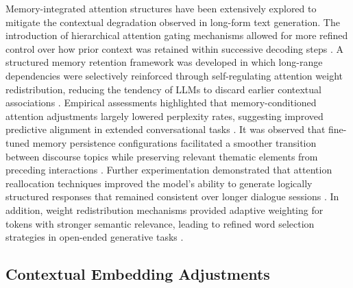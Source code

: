 Memory-integrated attention structures have been extensively explored to mitigate the contextual degradation observed in long-form text generation. The introduction of hierarchical attention gating mechanisms allowed for more refined control over how prior context was retained within successive decoding steps \cite{mahene2024automated}. A structured memory retention framework was developed in which long-range dependencies were selectively reinforced through self-regulating attention weight redistribution, reducing the tendency of LLMs to discard earlier contextual associations \cite{cakel2024daniel}. Empirical assessments highlighted that memory-conditioned attention adjustments largely lowered perplexity rates, suggesting improved predictive alignment in extended conversational tasks \cite{leonardi2024contextual}. It was observed that fine-tuned memory persistence configurations facilitated a smoother transition between discourse topics while preserving relevant thematic elements from preceding interactions \cite{bernar2024exploring}. Further experimentation demonstrated that attention reallocation techniques improved the model’s ability to generate logically structured responses that remained consistent over longer dialogue sessions \cite{harrington2024mitigating}. In addition, weight redistribution mechanisms provided adaptive weighting for tokens with stronger semantic relevance, leading to refined word selection strategies in open-ended generative tasks \cite{vulpescu2024optimized}.

\subsection{Contextual Embedding Adjustments}

